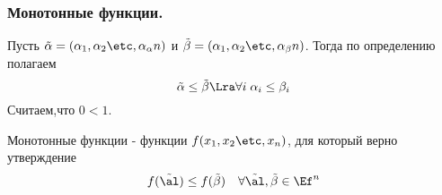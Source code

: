 \documentclass[unicode,10pt]{article}
\begin{document}
\subsubsection{Монотонные функции.}
  \begin{df}
     Пусть $\gset{n}$ и $\gset[\beta]{n}$. Тогда по определению полагаем
     \begin{displaymath}
       \tilde\alpha \le \tilde\beta \Lra\forall i \; \alpha_i \le \beta_i
     \end{displaymath}
     Считаем,что $0<1$.
  \end{df}
  \begin{df}
    Монотонные функции - функции $f(\set[x]{n})$, для который верно утверждение
    \begin{displaymath}
      f(\alt)\le f(\tilde\beta)\quad\forall \alt,\tilde\beta \in \Ef^n
    \end{displaymath}
  \end{df}
  \property
\end{document}
